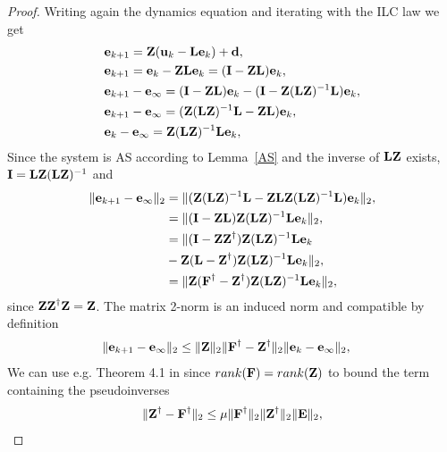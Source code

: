 \begin{proof}
Writing again the dynamics equation and iterating with the ILC law we get
%
\begin{align}
&\error_{k+1} = \latentMat(\sysInput_k - \lmatrix\error_k) + \linDist, \\
&\error_{k+1} = \error_{k} - \latentMat\lmatrix\error_k = (\vec{I} - \latentMat\lmatrix)\error_k, \\
&\error_{k+1} - \error_{\infty} = (\vec{I} - \latentMat\lmatrix)\error_k - (\vec{I} - \latentMat(\lmatrix\latentMat)^{-1}\lmatrix)\error_k, \\
&\error_{k+1} - \error_{\infty} = (\latentMat(\lmatrix\latentMat)^{-1}\lmatrix - \latentMat\lmatrix)\error_k, \\
&\error_{k} - \error_{\infty} = \latentMat(\lmatrix\latentMat)^{-1}\lmatrix\error_k,
\end{align}
%
Since the system is AS according to Lemma~\ref{AS} and the inverse of $\lmatrix\latentMat$ exists, $\vec{I} = \lmatrix\latentMat(\lmatrix\latentMat)^{-1}$ and
%
\begin{align}
\|\error_{k+1} - \error_{\infty}\|_2 &= \|(\latentMat(\lmatrix\latentMat)^{-1}\lmatrix - \latentMat\lmatrix\latentMat(\lmatrix\latentMat)^{-1}\lmatrix)\error_k\|_2, \\
&= \|(\vec{I} - \latentMat\lmatrix)\latentMat(\lmatrix\latentMat)^{-1}\lmatrix\error_k\|_2, \\
&= \|(\vec{I} - \latentMat\latentMat^{\dagger})\latentMat(\lmatrix\latentMat)^{-1}\lmatrix\error_k \\
& - \latentMat(\lmatrix -\latentMat^{\dagger})\latentMat(\lmatrix\latentMat)^{-1}\lmatrix\error_k\|_2, \\
&= \|\latentMat(\systemMat^{\dagger} - \latentMat^{\dagger})\latentMat(\lmatrix\latentMat)^{-1}\lmatrix\error_k\|_2,
\end{align}
%
since $\latentMat\latentMat^{\dagger}\latentMat = \latentMat$. The matrix 2-norm is an induced norm and compatible by definition
%
\begin{align}
\|\error_{k+1} - \error_{\infty}\|_2 &\leq \|\latentMat\|_2\|\systemMat^{\dagger} - \latentMat^{\dagger}\|_2\|\error_{k} - \error_{\infty}\|_2,
\end{align}
%
We can use e.g. Theorem 4.1 in \cite{Wedin73} since $rank(\systemMat) = rank(\latentMat)$ to bound the term containing the pseudoinverses
%
\begin{align}
\|\latentMat^{\dagger} - \systemMat^{\dagger}\|_{2} \leq \mu \|\systemMat^{\dagger}\|_2 \|\latentMat^{\dagger}\|_2 \|\errorMat\|_2,

\end{align}
\end{proof}
